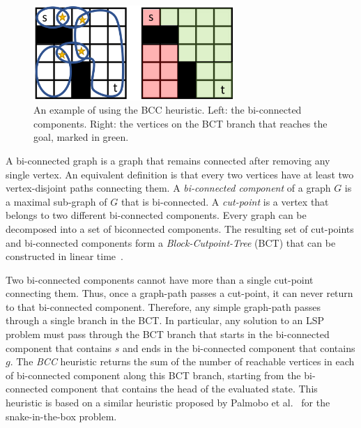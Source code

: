 \documentclass[letterpaper]{article} %
\newcommand\Yossi[1]{\nb{\textbf{Yossi:}}{green}{#1}}
\begin{document}
\begin{figure}[ht!]
  \centering
  \includegraphics[width=3in]{fig/h_example_bcc2.png}
  \caption{An example of using the BCC heuristic. Left: the bi-connected components. Right: the vertices on the BCT branch that reaches the goal, marked in green.}
  \label{fig:h_example_bcc}
\end{figure}

A bi-connected graph is a graph that remains connected after removing any single vertex. An equivalent definition is that every two vertices have at least two vertex-disjoint paths connecting them. A {\em bi-connected component} of a graph $G$ is a maximal sub-graph of $G$ that is bi-connected. A {\em cut-point} is a vertex that belongs to two different bi-connected components.
Every graph can be decomposed into a set of biconnected components. 
The resulting set of cut-points and bi-connected components form a {\em Block-Cutpoint-Tree} (BCT) that can be constructed in linear time~\cite{harary1966block,hopcroft1973algorithm}.  

Two bi-connected components cannot have more than a single cut-point connecting them. Thus, once a graph-path passes a cut-point, it can never return to that bi-connected component. 
Therefore, any simple graph-path passes through a single branch in the BCT.  
In particular, any solution to an LSP problem must pass through the BCT branch that starts in the bi-connected component that contains $s$ and ends in the bi-connected component that contains $g$.
The {\em BCC} heuristic returns the sum of the number of reachable vertices in each of bi-connected component along this BCT branch, starting from the bi-connected component that contains the head of the evaluated state.  This heuristic is based on a similar heuristic proposed by Palmobo et al.~ for the snake-in-the-box problem.
\end{document}
